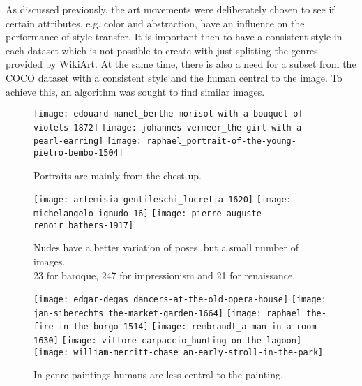 As discussed previously, the art movements were deliberately chosen to see if certain attributes, e.g. color and abstraction, have an influence on the performance of style transfer.
It is important then to have a consistent style in each dataset which is not possible to create with just splitting the genres provided by WikiArt.
At the same time, there is also a need for a subset from the COCO dataset with a consistent style and the human central to the image.
To achieve this, an algorithm was sought to find similar images.


\begin{figure}
	\centering
    \texttt{[image: edouard-manet\_berthe-morisot-with-a-bouquet-of-violets-1872]}
    \texttt{[image: johannes-vermeer\_the-girl-with-a-pearl-earring]}
    \texttt{[image: raphael\_portrait-of-the-young-pietro-bembo-1504]}
	\caption{
        Portraits are mainly from the chest up.
	}
    \label{fig:wikiart_shortcomings_portraits}
\end{figure}
\begin{figure}
    \centering
    \captionsetup{justification=centering}
    \texttt{[image: artemisia-gentileschi\_lucretia-1620]}
    \texttt{[image: michelangelo\_ignudo-16]}
    \texttt{[image: pierre-auguste-renoir\_bathers-1917]}
	\caption{
        Nudes have a better variation of poses, but a small number of images. \\
        23 for baroque, 247 for impressionism and 21 for renaissance.
	}
    \label{fig:wikiart_shortcomings_nudes}
\end{figure}
\begin{figure}
    \centering
    {
        \texttt{[image: edgar-degas\_dancers-at-the-old-opera-house]}%
        \texttt{[image: jan-siberechts\_the-market-garden-1664]}%
        \texttt{[image: raphael\_the-fire-in-the-borgo-1514]}%
    }
    {%
        \texttt{[image: rembrandt\_a-man-in-a-room-1630]}%
        \texttt{[image: vittore-carpaccio\_hunting-on-the-lagoon]}%
        \texttt{[image: william-merritt-chase\_an-early-stroll-in-the-park]}%
    }
	\caption{
        In genre paintings humans are less central to the painting.
	}
    \label{fig:wikiart_shortcomings_genre}
\end{figure}
